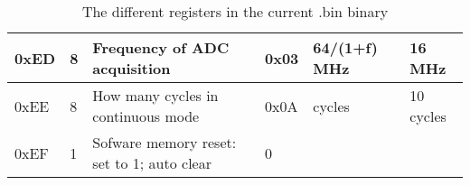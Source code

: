 \begin{table}[!htbp]
\begin{tabular}{|l|l|l|l|l|l|}
0xED    & 8           & Frequency of ADC acquisition               & 0x03                 & 64/(1+f) MHz & 16 MHz    \\ \hline
0xEE    & 8           & How many cycles in continuous mode        & 0x0A                 & cycles       & 10 cycles \\ \hline
0xEF    & 1           & Sofware memory reset: set to 1; auto clear & 0                    &              &           \\ \hline \hline
\end{tabular}
 \vspace{4pt}
  \caption{The different registers in the current .bin binary}
    \vspace{-20pt}
\end{table}
